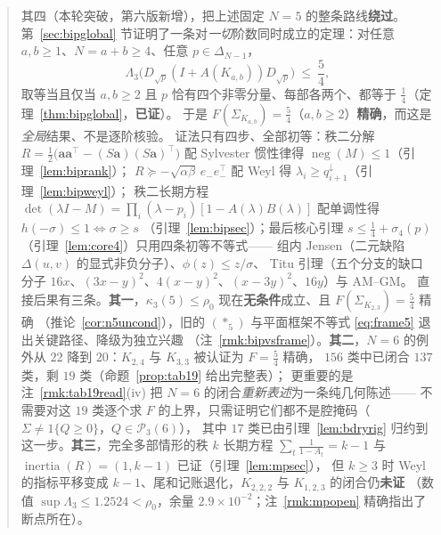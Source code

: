 \documentclass[UTF8,11pt]{ctexart}
\theoremstyle{definition}
\newcommand{\Lam}{\Lambda}
\begin{document}
\begin{abstract}
其四（本轮突破，第六版新增），把上述固定 $N=5$ 的整条路线\textbf{绕过}。
第~\ref{sec:bipglobal} 节证明了一条对\emph{一切}阶数同时成立的定理：对任意 $a,b\ge1$、$N=a+b\ge4$、任意 $p\in\Delta_{N-1}$，
\begin{equation*}
\Lam_3\bigl(D_{\sqrt p}(I+A(K_{a,b}))D_{\sqrt p}\bigr)\ \le\ \frac54 ,
\end{equation*}
取等当且仅当 $a,b\ge2$ 且 $p$ 恰有四个非零分量、每部各两个、都等于 $\frac14$（定理~\ref{thm:bipglobal}，\textbf{已证}）。
于是 $F(\Sigma_{K_{a,b}})=\frac54$（$a,b\ge2$）\textbf{精确}，而这是\emph{全局}结果、不是逐阶核验。
证法只有四步、全部初等：秩二分解 $R=\frac12\bigl(\mathbf a\mathbf a^\top-(S\mathbf a)(S\mathbf a)^\top\bigr)$
配 Sylvester 惯性律得 $\operatorname{neg}(M)\le1$（引理~\ref{lem:biprank}）；
$R\succeq-\sqrt{\alpha\beta}\,e_-e_-^\top$ 配 Weyl 得 $\lambda_i\ge q^\downarrow_{i+1}$（引理~\ref{lem:bipweyl}）；
秩二长期方程 $\det(\lambda I-M)=\prod_i(\lambda-p_i)[1-A(\lambda)B(\lambda)]$ 配单调性得 $h(-\sigma)\le1\iff\sigma\ge s$
（引理~\ref{lem:bipsec}）；最后核心引理 $s\le\frac14+\sigma_4(p)$（引理~\ref{lem:core4}）只用四条初等不等式——
组内 Jensen（二元缺陷 $\Delta(u,v)$ 的显式非负分子）、$\phi(z)\le z/\sigma$、
Titu 引理（五个分支的缺口分子 $16x$、$(3x-y)^2$、$4(x-y)^2$、$(x-3y)^2$、$16y$）与 AM--GM。
直接后果有三条。\textbf{其一}，$\kappa_3(5)\le\rho_0$ 现在\textbf{无条件}成立、且 $F(\Sigma_{K_{2,3}})=\frac54$ 精确
（推论~\ref{cor:n5uncond}），旧的 $(\ast_5)$ 与平面框架不等式 \eqref{eq:frame5} 退出关键路径、降级为独立兴趣
（注~\ref{rmk:bipvsframe}）。\textbf{其二}，$N=6$ 的例外从 $22$ 降到 $20$：$K_{2,4}$ 与 $K_{3,3}$ 被认证为 $F=\frac54$ 精确，
$156$ 类中已闭合 $137$ 类，剩 $19$ 类（命题~\ref{prop:tab19} 给出完整表）；
更重要的是注~\ref{rmk:tab19read}(iv) 把 $N=6$ 的闭合\emph{重新表述}为一条纯几何陈述——
不需要对这 $19$ 类逐个求 $F$ 的上界，只需证明它们都不是腔掩码（$\Sigma\ne1\{Q\ge0\}$，$Q\in\mathcal P_3(6)$），
其中 $17$ 类已由引理~\ref{lem:bdryrig} 归约到这一步。\textbf{其三}，完全多部情形的秩 $k$ 长期方程
$\sum_t\frac1{1-A_t}=k-1$ 与 $\operatorname{inertia}(R)=(1,k-1)$ 已证（引理~\ref{lem:mpsec}），
但 $k\ge3$ 时 Weyl 的指标平移变成 $k-1$、尾和记账退化，$K_{2,2,2}$ 与 $K_{1,2,3}$ 的闭合仍\textbf{未证}
（数值 $\sup\Lam_3\le1.2524<\rho_0$，余量 $2.9\times10^{-2}$；注~\ref{rmk:mpopen} 精确指出了断点所在）。


\end{abstract}
\end{document}
